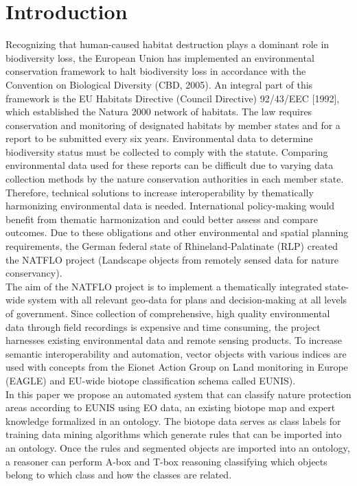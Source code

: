 \documentclass[authoryear, review,12pt,number]{elsarticle}
\begin{document}
\section{Introduction} 
Recognizing that human-caused habitat destruction plays a dominant role in
biodiversity loss, the European Union has implemented an environmental
conservation framework to halt biodiversity loss in accordance with the
Convention on Biological Diversity (CBD, 2005). An integral part of this
framework is the EU Habitats Directive (Council Directive) 92/43/EEC [1992],
which established the Natura 2000 network of habitats. The law requires
conservation and monitoring of designated habitats by member states and for a
report to be submitted every six years. Environmental data 
to determine biodiversity status must be collected to comply with the 
statute. Comparing environmental data used for these reports can be 
difficult due to varying data collection methods by the 
nature conservation authorities in each member state. Therefore, technical 
solutions to increase interoperability by thematically harmonizing 
environmental data is needed. International policy-making would benefit from 
thematic harmonization and could better assess and compare outcomes. Due to 
these obligations and other environmental and spatial planning requirements, 
the German federal state of
Rhineland-Palatinate (RLP) created the NATFLO project (Landscape objects from
remotely sensed data for nature conservancy).\\
The aim of the NATFLO project is to implement a
thematically integrated state-wide system with all relevant geo-data for plans
and decision-making at all levels of government.  Since collection of
comprehensive, high quality environmental data through field recordings is
expensive and time consuming, the project harnesses existing environmental data
and remote sensing products. To increase semantic interoperability and
automation, vector objects with various indices are used with concepts from the
Eionet Action Group on Land monitoring in Europe (EAGLE) and EU-wide 
biotope classification schema called EUNIS).\\
In this paper we propose an automated system that can classify nature protection
areas according to EUNIS using EO data, an existing biotope map
and expert knowledge formalized in an ontology. The biotope data serves as class
labels for training data mining algorithms which generate rules that can be
imported into an ontology. Once the rules and segmented objects are imported
into an ontology, a reasoner can perform A-box and T-box reasoning classifying
which objects belong to which class and how the classes are related. 
\end{document}

